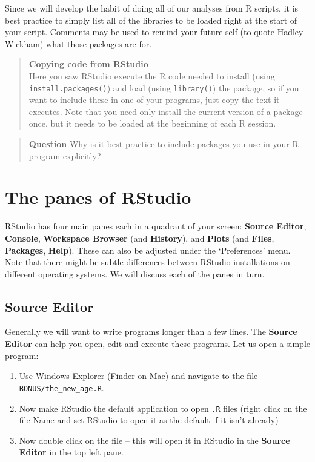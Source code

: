 \documentclass[
]{book}
\begin{document}
Since we will develop the habit of doing all of our analyses from R scripts, it is best practice to simply list all of the libraries to be loaded right at the start of your script. Comments may be used to remind your future-self (to quote Hadley Wickham) what those packages are for.

\begin{quote}
\textbf{Copying code from RStudio}\\
Here you saw RStudio execute the R code needed to install (using \texttt{install.packages()}) and load (using \texttt{library()}) the package, so if you want to include these in one of your programs, just copy the text it executes. Note that you need only install the current version of a package once, but it needs to be loaded at the beginning of each R session.
\end{quote}

\begin{quote}
\textbf{Question}
Why is it best practice to include packages you use in your R program explicitly?
\end{quote}

\hypertarget{the-panes-of-rstudio}{%
\section{The panes of RStudio}\label{the-panes-of-rstudio}}

RStudio has four main panes each in a quadrant of your screen: \textbf{Source Editor}, \textbf{Console}, \textbf{Workspace Browser} (and \textbf{History}), and \textbf{Plots} (and \textbf{Files}, \textbf{Packages}, \textbf{Help}). These can also be adjusted under the `Preferences' menu. Note that there might be subtle differences between RStudio installations on different operating systems. We will discuss each of the panes in turn.

\hypertarget{source-editor}{%
\subsection{Source Editor}\label{source-editor}}

Generally we will want to write programs longer than a few lines. The \textbf{Source Editor} can help you open, edit and execute these programs. Let us open a simple program:

\begin{enumerate}
\def\labelenumi{\arabic{enumi}.}
\item
  Use Windows Explorer (Finder on Mac) and navigate to the file \texttt{BONUS/the\_new\_age.R}.
\item
  Now make RStudio the default application to open \texttt{.R} files (right click on the file Name and set RStudio to open it as the default if it isn't already)
\item
  Now double click on the file -- this will open it in RStudio in the \textbf{Source Editor} in the top left pane.
\end{enumerate}
\end{document}
